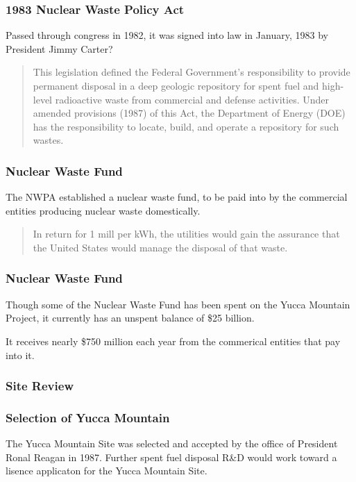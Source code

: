 
\begin{frame}[ctb!]
  \frametitle{1983 Nuclear Waste Policy Act}
  Passed through congress in 1982, it was signed into law in January, 1983 by 
  President Jimmy Carter?

  \begin{quotation}
    This legislation defined the Federal Government’s responsibility to provide 
    permanent disposal in a deep geologic repository for spent fuel and high-level 
    radioactive waste from commercial and defense activities. Under amended 
    provisions (1987)  of this Act, the Department of Energy (DOE) has the 
    responsibility to locate, build, and operate a repository for such wastes. 
    \cite{nrc_backgrounder_2011}
  \end{quotation}

\end{frame}

\begin{frame}[ctb!]
  \frametitle{Nuclear Waste Fund}
  The NWPA established a nuclear waste fund, to be paid into by the commercial 
  entities producing nuclear waste domestically.
  \begin{quotation}
    In return for 1 mill per kWh, the utilities would gain the assurance that 
    the United States would manage the disposal of that waste.
  \end{quotation}

\end{frame}

\begin{frame}[ctb!]
  \frametitle{Nuclear Waste Fund}
  Though some of the Nuclear Waste Fund has been spent on the Yucca Mountain 
  Project, it currently has an unspent balance of \$25 billion. 

  It receives nearly \$750 million each year from the commerical entities that 
  pay into it.
\end{frame}


\begin{frame}[ctb!]
  \frametitle{Site Review}
  
\end{frame}

\begin{frame}[ctb!]
  \frametitle{Selection of Yucca Mountain}

  The Yucca Mountain Site was selected and accepted by the office of President 
  Ronal Reagan in 1987. Further spent fuel disposal R\&D would work toward a 
  lisence applicaton for the Yucca Mountain Site. 
  
\end{frame}
